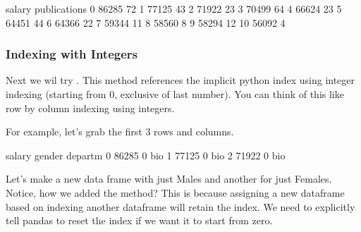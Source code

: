 \documentclass[letterpaper,10pt,english]{sphinxmanual}
\begin{document}
\begin{sphinxVerbatim}[commandchars=\\\{\}]
    salary  publications
0    86285            72
1    77125            43
2    71922            23
3    70499            64
4    66624            23
5    64451            44
6    64366            22
7    59344            11
8    58560             8
9    58294            12
10   56092             4
\end{sphinxVerbatim}


\subsubsection{Indexing with Integers}
\label{\detokenize{content/Introduction_to_Pandas:indexing-with-integers}}
Next we wil try .  This method references the implicit python index using integer indexing (starting from 0, exclusive of last number).  You can think of this like row by column indexing using integers.

For example, let’s grab the first 3 rows and columns.

\begin{sphinxVerbatim}[commandchars=\\\{\}]
\PYG{p}{[} \PYG{p}{]}
\end{sphinxVerbatim}

\begin{sphinxVerbatim}[commandchars=\\\{\}]
   salary  gender departm
0   86285       0     bio
1   77125       0     bio
2   71922       0     bio
\end{sphinxVerbatim}

Let’s make a new data frame with just Males and another for just Females. Notice, how we added the  method?   This is because assigning a new dataframe based on indexing another dataframe will retain the  index.  We need to explicitly tell pandas to reset the index if we want it to start from zero.

\begin{sphinxVerbatim}[commandchars=\\\{\}]
  \PYG{p}{[}  \PYG{p}{]}
  \PYG{p}{[}  \PYG{p}{]}
\end{sphinxVerbatim}
\end{document}
